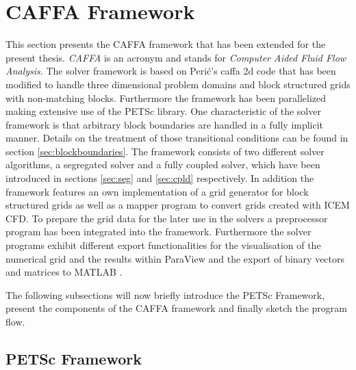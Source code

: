 \section{CAFFA Framework}

This section presents the CAFFA framework that has been extended for the present thesis. \emph{CAFFA} is an acronym and stands for \emph{Computer Aided Fluid Flow Analysis}. The solver framework is based on Peri\'c's caffa 2d code \cite{caffawebpage} that has been modified to handle three dimensional problem domains and block structured grids with non-matching blocks. Furthermore the framework has been parallelized making extensive use of the PETSc library. One characteristic of the solver framework is that arbitrary block boundaries are handled in a fully implicit manner. Details on the treatment of those transitional conditions can be found in section \ref{sec:blockboundaries}. The framework consists of two different solver algorithms, a segregated solver and a fully coupled solver, which have been introduced in sections \ref{sec:seg} and \ref{sec:cpld} respectively. In addition the framework features an own implementation of a grid generator for block structured grids as well as a mapper program to convert grids created with ICEM CFD. To prepare the grid data for the later use in the solvers a preprocessor program has been integrated into the framework. Furthermore the solver programs exhibit different export functionalities for the visualisation of the numerical grid and the results within ParaView \cite{paraview} and the export of binary vectors and matrices to MATLAB \textregistered \cite{matlab}.

The following subsections will now briefly introduce the PETSc Framework, present the components of the CAFFA framework and finally sketch the program flow.

\subsection{PETSc Framework}

